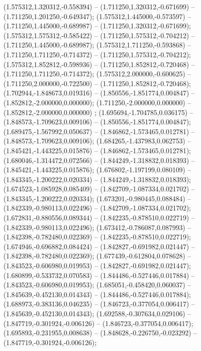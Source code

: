  (1.575312,1.320312,-0.558394) -- (1.711250,1.320312,-0.671699) -- (1.711250,1.201250,-0.649347);
 (1.575312,1.445000,-0.573597) -- (1.711250,1.445000,-0.689987) -- (1.711250,1.320312,-0.671699);
 (1.575312,1.575312,-0.585422) -- (1.711250,1.575312,-0.704212) -- (1.711250,1.445000,-0.689987);
 (1.575312,1.711250,-0.593868) -- (1.711250,1.711250,-0.714372) -- (1.711250,1.575312,-0.704212);
 (1.575312,1.852812,-0.598936) -- (1.711250,1.852812,-0.720468) -- (1.711250,1.711250,-0.714372);
 (1.575312,2.000000,-0.600625) -- (1.711250,2.000000,-0.722500) -- (1.711250,1.852812,-0.720468);
 (1.702944,-1.848673,0.019316) -- (1.850556,-1.851774,0.004847) -- (1.852812,-2.000000,0.000000);
 (1.711250,-2.000000,0.000000) -- (1.852812,-2.000000,0.000000) ;
 (1.695694,-1.704785,0.036175) -- (1.848573,-1.709623,0.009106) -- (1.850556,-1.851774,0.004847);
 (1.689475,-1.567992,0.050637) -- (1.846862,-1.573465,0.012781) -- (1.848573,-1.709623,0.009106);
 (1.684265,-1.437983,0.062753) -- (1.845421,-1.443225,0.015876) -- (1.846862,-1.573465,0.012781);
 (1.680046,-1.314472,0.072566) -- (1.844249,-1.318832,0.018393) -- (1.845421,-1.443225,0.015876);
 (1.676802,-1.197199,0.080109) -- (1.843345,-1.200222,0.020334) -- (1.844249,-1.318832,0.018393);
 (1.674523,-1.085928,0.085409) -- (1.842709,-1.087334,0.021702) -- (1.843345,-1.200222,0.020334);
 (1.673201,-0.980445,0.088484) -- (1.842339,-0.980113,0.022496) -- (1.842709,-1.087334,0.021702);
 (1.672831,-0.880556,0.089344) -- (1.842235,-0.878510,0.022719) -- (1.842339,-0.980113,0.022496);
 (1.673412,-0.786087,0.087993) -- (1.842398,-0.782480,0.022369) -- (1.842235,-0.878510,0.022719);
 (1.674946,-0.696882,0.084424) -- (1.842827,-0.691982,0.021447) -- (1.842398,-0.782480,0.022369);
 (1.677439,-0.612804,0.078628) -- (1.843523,-0.606980,0.019953) -- (1.842827,-0.691982,0.021447);
 (1.680899,-0.533732,0.070583) -- (1.844486,-0.527446,0.017884) -- (1.843523,-0.606980,0.019953);
 (1.685051,-0.458420,0.060037) -- (1.845639,-0.452130,0.014343) -- (1.844486,-0.527446,0.017884);
 (1.688973,-0.383136,0.046235) -- (1.846723,-0.377054,0.006417) -- (1.845639,-0.452130,0.014343);
 (1.692588,-0.307634,0.029106) -- (1.847719,-0.301924,-0.006126) -- (1.846723,-0.377054,0.006417);
 (1.695893,-0.231955,0.008638) -- (1.848628,-0.226750,-0.023292) -- (1.847719,-0.301924,-0.006126);
